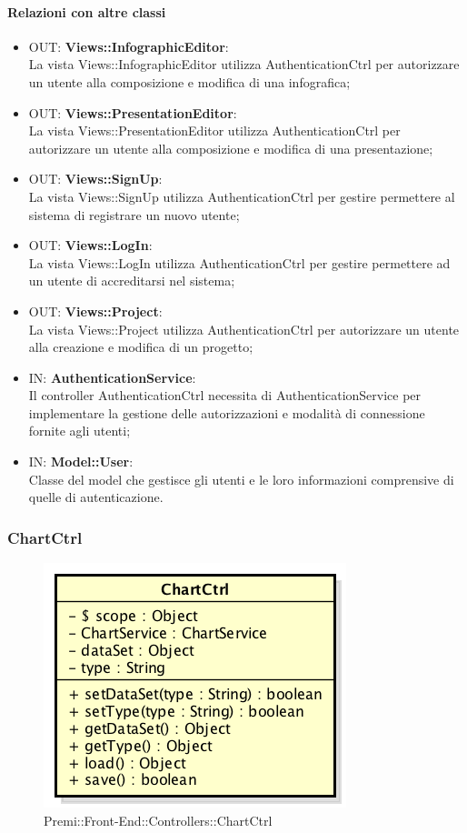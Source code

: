 \paragraph{Relazioni con altre classi}
\begin{itemize}
	\item OUT: \textbf{Views::InfographicEditor}:\\
	La vista Views::InfographicEditor utilizza AuthenticationCtrl per autorizzare un utente alla composizione e modifica di una infografica;
	\item OUT: \textbf{Views::PresentationEditor}:\\
	La vista Views::PresentationEditor utilizza AuthenticationCtrl per autorizzare un utente alla composizione e modifica di una presentazione;
	\item OUT: \textbf{Views::SignUp}:\\
	La vista Views::SignUp utilizza AuthenticationCtrl per gestire permettere al sistema di registrare un nuovo utente;
	\item OUT: \textbf{Views::LogIn}:\\
	La vista Views::LogIn utilizza AuthenticationCtrl per gestire permettere ad un utente di accreditarsi nel sistema;
	\item OUT: \textbf{Views::Project}:\\
	La vista Views::Project utilizza AuthenticationCtrl per autorizzare un utente alla creazione e modifica di un progetto;
	\item IN: \textbf{AuthenticationService}:\\
	Il controller AuthenticationCtrl necessita di AuthenticationService per implementare la gestione delle autorizzazioni e modalità di connessione fornite agli utenti;
	
	\item IN: \textbf{Model::User}:\\
	Classe del model che gestisce gli utenti e le loro informazioni comprensive di quelle di autenticazione.
\end{itemize}

\newpage
\subsubsection{ChartCtrl}
\begin{figure}[h]
	\centering
	\includegraphics[width=0.4\linewidth]{img/premi_front_end_controllers_chartctrl}
	\caption[Premi::Front-End::Controllers::ChartCtrl]{Premi::Front-End::Controllers::ChartCtrl}
\end{figure}
